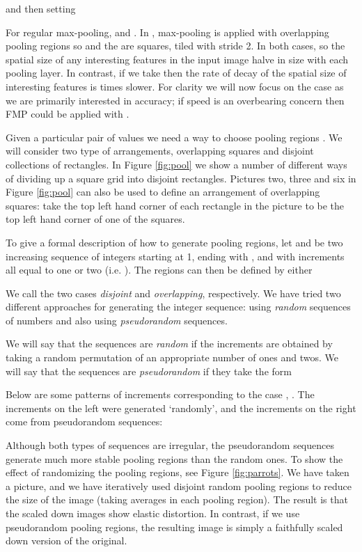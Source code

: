 \documentclass[english]{article}
\begin{document}
and then setting

For regular  max-pooling, 
and . In \cite{conf/nips/KrizhevskySH12},
max-pooling is applied with overlapping  pooling regions
so  and the  are 
squares, tiled with stride 2. In both cases, 
so the spatial size of any interesting features in the input image
halve in size with each pooling layer. In contrast, if we take 
then the rate of decay of the spatial size of interesting features
is  times slower. For clarity we will now focus on the case 
as we are primarily interested in accuracy; if speed is an overbearing
concern then FMP could be applied with .

Given a particular pair of values 
we need a way to choose pooling regions . We will consider
two type of arrangements, overlapping squares and disjoint collections
of rectangles. In Figure \ref{fig:pool} we show a number of different
ways of dividing up a  square grid into disjoint rectangles.
Pictures two, three and six in Figure \ref{fig:pool} can also be
used to define an arrangement of overlapping  squares:
take the top left hand corner of each rectangle in the picture to
be the top left hand corner of one of the squares.

To give a formal description of how to generate pooling regions, let
 and 
be two increasing sequence of integers starting at 1, ending with
, and with increments all equal to one or two (i.e.
). The regions can then be defined by either

We call the two cases \emph{disjoint} and \emph{overlapping}, respectively.
We have tried two different approaches for generating the integer
sequence: using \emph{random} sequences of numbers and also using
\emph{pseudorandom }sequences.

We will say that the sequences are \emph{random} if the increments
are obtained by taking a random permutation of an appropriate number
of ones and twos. We will say that the sequences are \emph{pseudorandom}
if they take the form

 Below are some patterns of increments corresponding to the case ,
. The increments on the left were generated\emph{
}`randomly', and the increments on the right come from pseudorandom
sequences:

Although both types of sequences are irregular, the pseudorandom sequences
generate much more stable pooling regions than the random ones. To
show the effect of randomizing the pooling regions, see Figure \ref{fig:parrots}.
We have taken a picture, and we have iteratively used disjoint random
pooling regions to reduce the size of the image (taking averages in
each pooling region). The result is that the scaled down images show
elastic distortion. In contrast, if we use pseudorandom pooling regions,
the resulting image is simply a faithfully scaled down version of
the original.
\end{document}
